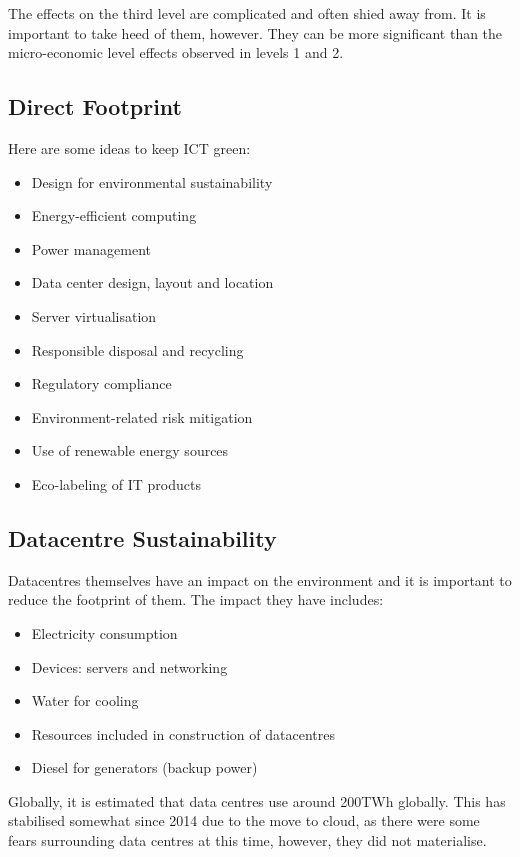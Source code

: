 \documentclass[11pt,a4paper,titlepage,dvipsnames,cmyk]{scrartcl}
\begin{document}
The effects on the third level are complicated and often shied away from. It is important to take heed of them, however. They can be more significant than the micro-economic level effects observed in levels 1 and 2.

\subsection{Direct Footprint}
Here are some ideas to keep ICT green:
\begin{itemize}
    \item Design for environmental sustainability
    \item Energy-efficient computing
    \item Power management
    \item Data center design, layout and location
    \item Server virtualisation
    \item Responsible disposal and recycling
    \item Regulatory compliance
    \item Environment-related risk mitigation
    \item Use of renewable energy sources
    \item Eco-labeling of IT products
\end{itemize}

\subsection{Datacentre Sustainability}
Datacentres themselves have an impact on the environment and it is important to reduce the footprint of them. The impact they have includes:
\begin{itemize}
    \item Electricity consumption
    \item Devices: servers and networking
    \item Water for cooling
    \item Resources included in construction of datacentres
    \item Diesel for generators (backup power)
\end{itemize}

Globally, it is estimated that data centres use around 200TWh globally. This has stabilised somewhat since 2014 due to the move to cloud, as there were some fears surrounding data centres at this time, however, they did not materialise.
\end{document}
